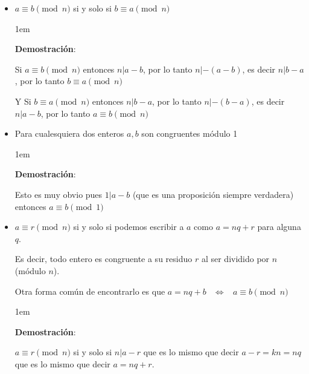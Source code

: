 \documentclass[12pt, fleqn]{report}                             %
\newenvironment{SmallIndentation}[1][0.75em]                    %
    {\begin{adjustwidth}{#1}{}\begin{footnotesize}}                 %
    {\end{footnotesize}\end{adjustwidth}}                           %
\DeclareMathOperator \Space {\quad}                             %
\DeclareMathOperator \MiniSpace {\;}                            %
\newcommand \lequal {\MiniSpace \Leftrightarrow \MiniSpace}     %
\begin{document}
            \begin{itemize}

                \item $a \equiv b \pmod{n}$ si y solo si $b \equiv a \pmod{n}$

                    \begin{SmallIndentation}[1em]
                        \textbf{Demostración}:

                        Si $a \equiv b \pmod{n}$ entonces $n | a - b$, por lo tanto
                        $n | -(a - b)$, es decir $n|b-a$, por lo tanto $b \equiv a \pmod{n}$

                        Y Si $b \equiv a \pmod{n}$ entonces $n | b - a$, por lo tanto
                        $n | -(b - a)$, es decir $n|a-b$, por lo tanto $a \equiv b \pmod{n}$

                    \end{SmallIndentation}

                \item Para cualesquiera dos enteros $a,b$ son congruentes módulo 1

                    \begin{SmallIndentation}[1em]
                        \textbf{Demostración}:

                        Esto es muy obvio pues $1|a-b$ (que es una proposición siempre
                        verdadera) entonces $a \equiv b \pmod{1}$

                    \end{SmallIndentation}

                \item $a \equiv r \pmod{n}$ si y solo si podemos escribir a $a$ como $a=nq+r$
                    para alguna $q$.

                    Es decir, todo entero es congruente a su residuo $r$ al ser dividido por $n$
                    (módulo $n$).

                    Otra forma común de encontrarlo es que
                    $a=nq+b \lequal a \equiv b \pmod{n}$ 


                    \begin{SmallIndentation}[1em]
                        \textbf{Demostración}:

                        $a \equiv r \pmod{n}$ si y solo si $n|a-r$ que es lo mismo
                        que decir $a-r = kn = nq$ que es lo mismo que decir $a=nq+r$.


\end{SmallIndentation}
\end{itemize}
\end{document}
